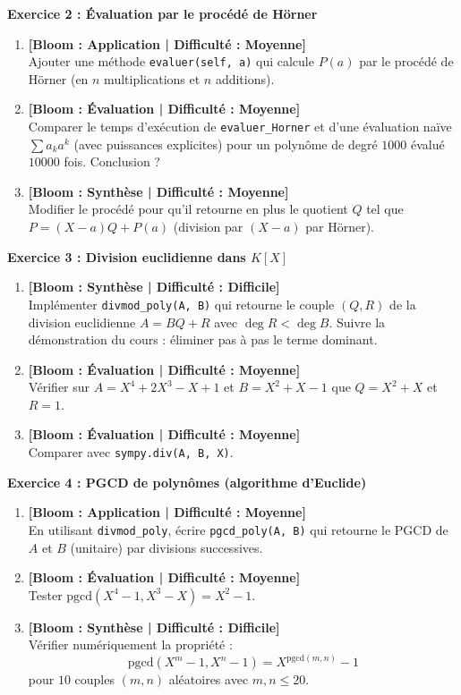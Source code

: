 \documentclass[12pt,a4paper]{report}
\theoremstyle{definition}
\theoremstyle{remark}
\begin{document}
\noindent\textbf{Exercice 2 : Évaluation par le procédé de Hörner}
\begin{enumerate}
    \item \textbf{[Bloom : Application | Difficulté : Moyenne]} \\
    Ajouter une méthode \texttt{evaluer(self, a)} qui calcule $P(a)$ par le procédé de Hörner (en $n$ multiplications et $n$ additions).
    \item \textbf{[Bloom : Évaluation | Difficulté : Moyenne]} \\
    Comparer le temps d'exécution de \texttt{evaluer\_Horner} et d'une évaluation naïve $\sum a_k a^k$ (avec puissances explicites) pour un polynôme de degré $1000$ évalué $10000$ fois. Conclusion ?
    \item \textbf{[Bloom : Synthèse | Difficulté : Moyenne]} \\
    Modifier le procédé pour qu'il retourne en plus le quotient $Q$ tel que $P = (X - a) Q + P(a)$ (division par $(X - a)$ par Hörner).
\end{enumerate}

\vspace{0.3cm}

\noindent\textbf{Exercice 3 : Division euclidienne dans $K[X]$}
\begin{enumerate}
    \item \textbf{[Bloom : Synthèse | Difficulté : Difficile]} \\
    Implémenter \texttt{divmod\_poly(A, B)} qui retourne le couple $(Q, R)$ de la division euclidienne $A = BQ + R$ avec $\deg R < \deg B$. Suivre la démonstration du cours : éliminer pas à pas le terme dominant.
    \item \textbf{[Bloom : Évaluation | Difficulté : Moyenne]} \\
    Vérifier sur $A = X^4 + 2X^3 - X + 1$ et $B = X^2 + X - 1$ que $Q = X^2 + X$ et $R = 1$.
    \item \textbf{[Bloom : Évaluation | Difficulté : Moyenne]} \\
    Comparer avec \texttt{sympy.div(A, B, X)}.
\end{enumerate}

\vspace{0.3cm}

\noindent\textbf{Exercice 4 : PGCD de polynômes (algorithme d'Euclide)}
\begin{enumerate}
    \item \textbf{[Bloom : Application | Difficulté : Moyenne]} \\
    En utilisant \texttt{divmod\_poly}, écrire \texttt{pgcd\_poly(A, B)} qui retourne le PGCD de $A$ et $B$ (unitaire) par divisions successives.
    \item \textbf{[Bloom : Évaluation | Difficulté : Moyenne]} \\
    Tester $\mathrm{pgcd}(X^4 - 1, X^3 - X) = X^2 - 1$.
    \item \textbf{[Bloom : Synthèse | Difficulté : Difficile]} \\
    Vérifier numériquement la propriété :
    \[ \mathrm{pgcd}(X^m - 1, X^n - 1) = X^{\mathrm{pgcd}(m, n)} - 1 \]
    pour $10$ couples $(m, n)$ aléatoires avec $m, n \le 20$.
\end{enumerate}
\end{document}
